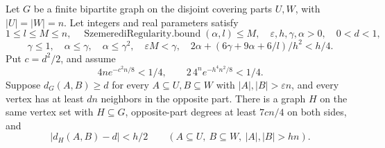 \begin{lemma}
Let $G$ be a finite bipartite graph on the disjoint covering parts
$U,W$, with $|U|=|W|=n$. Let integers and real parameters satisfy
\[
1\leq l\leq M\leq n,\quad\operatorname{SzemerediRegularity.bound}(\alpha,l)\leq M,
\quad\varepsilon,h,\gamma,\alpha>0,\quad0<d<1,
\]
\[
\gamma\leq1,\quad\alpha\leq\gamma,\quad\alpha\leq\gamma^2,
\quad\varepsilon M<\gamma,
\quad2\alpha+(6\gamma+9\alpha+6/l)/h^2<h/4.
\]
Put $c=d^2/2$, and assume
\[
4n e^{-c^2n/8}<1/4,\qquad2\,4^n e^{-h^4n^2/8}<1/4.
\]
Suppose $d_G(A,B)\geq d$ for every $A\subseteq U,B\subseteq W$
with $|A|,|B|>\varepsilon n$, and every vertex has at least $dn$
neighbors in the opposite part. There is a graph $H$ on the same
vertex set with $H\subseteq G$, opposite-part degrees at least
$7cn/4$ on both sides, and
\[
|d_H(A,B)-d|<h/2\qquad
(A\subseteq U,\ B\subseteq W,\ |A|,|B|>hn).
\]
\end{lemma}
